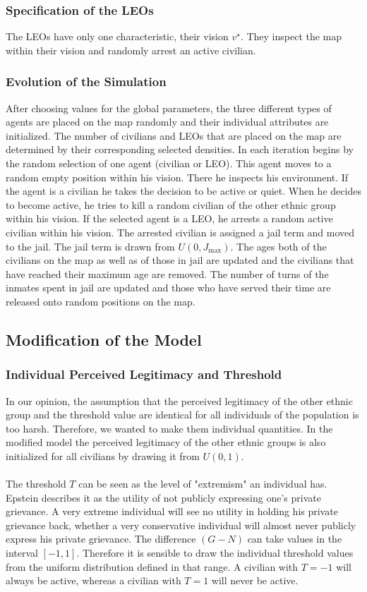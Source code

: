 \documentclass[11pt]{article}
\begin{document}
\subsubsection{Specification of the LEOs}
The LEOs have only one characteristic, their vision $v^\star$. They inspect the map within their vision and randomly arrest an active civilian.

\subsubsection{Evolution of the Simulation}
After choosing values for the global parameters, the three different types of agents are placed on the map randomly and their individual attributes are initialized. The number of civilians and LEOs that are placed on the map are determined by their corresponding selected densities. In each iteration begins by the random selection of one agent (civilian or LEO). This agent moves to a random empty position within his vision. There he inspects his environment. If the agent is a civilian he takes the decision to be active or quiet. When he decides to become active, he tries to kill a random civilian of the other ethnic group within his vision. If the selected agent is a LEO, he arrests a random active civilian within his vision. The arrested civilian is assigned a jail term and moved to the jail. The jail term is drawn from $U(0,J_{\text{max}})$. The ages both of the civilians on the map as well as of those in jail are updated and the civilians that have reached their maximum age are removed. The number of turns of the inmates spent in jail are updated and those who have served their time are released onto random positions on the map.

\subsection{Modification of the Model}

\subsubsection{Individual Perceived Legitimacy and Threshold}
In our opinion, the assumption that the perceived legitimacy of the other ethnic group and the threshold value are identical for all individuals of the population is too harsh. Therefore, we wanted to make them individual quantities. In the modified model the perceived legitimacy of the other ethnic groups is also initialized for all civilians by drawing it from $U(0,1)$.\\
\\
The threshold $T$ can be seen as the level of "extremism" an individual has. Epstein describes it as the utility of not publicly expressing one's private grievance. A very extreme individual will see no utility in holding his private grievance back, whether a very conservative individual will almost never publicly express his private grievance. The difference $(G-N)$ can take values in the interval $[-1,1]$. Therefore it is sensible to draw the individual threshold values from the uniform distribution defined in that range. A civilian with $T = -1$ will always be active, whereas a civilian with $T = 1$ will never be active.
\end{document}
